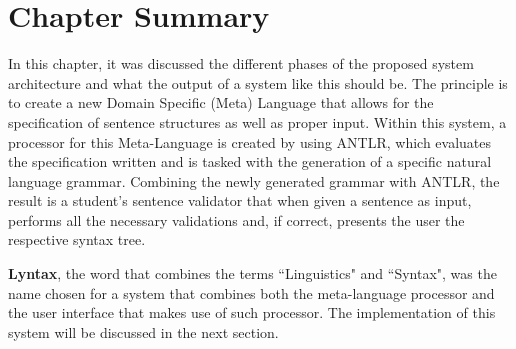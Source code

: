 \section{Chapter Summary}

In this chapter, it was discussed the different phases of the proposed system architecture and what the output of a system like this should be.
The principle is to create a new Domain Specific (Meta) Language that allows for the specification of sentence structures as well as proper input.
Within this system, a processor for this Meta-Language is created by using \textsc{ANTLR},
which evaluates the specification written and is tasked with the generation of a specific natural language grammar.
Combining the newly generated grammar with \textsc{ANTLR}, the result is a student's sentence validator
that when given a sentence as input, performs all the necessary validations and, if correct, presents the user the respective syntax tree.

\textbf{Lyntax}, the word that combines the terms ``Linguistics" and ``Syntax", was the name chosen for a system that combines both the meta-language processor and
the user interface that makes use of such processor.
The implementation of this system will be discussed in the next section.
